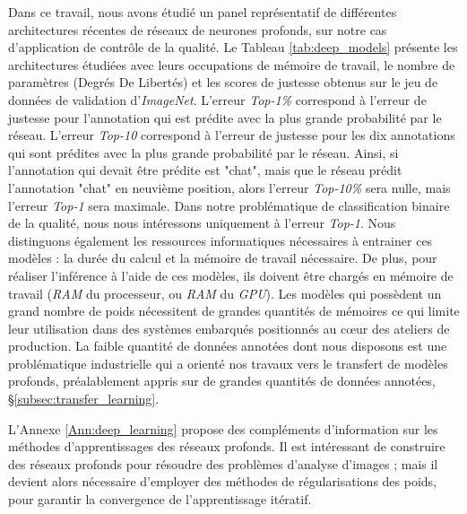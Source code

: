Dans ce travail, nous avons étudié un panel représentatif de différentes architectures récentes de réseaux de neurones profonds, sur notre cas d'application de contrôle de la qualité.
Le Tableau \ref{tab:deep_models} présente les architectures étudiées avec leurs occupations de mémoire de travail, le nombre de paramètres (Degrés De Libertés) et les scores de justesse obtenus sur le jeu de données de validation d'\textit{ImageNet}.
L'erreur \textit{Top-1\%} correspond à l'erreur de justesse pour l'annotation qui est prédite avec la plus grande probabilité par le réseau.
L'erreur \textit{Top-10} correspond à l'erreur de justesse pour les dix annotations qui sont prédites avec la plus grande probabilité par le réseau.
Ainsi, si l'annotation qui devait être prédite est "chat", mais que le réseau prédit l'annotation "chat" en neuvième position, alors l'erreur \textit{Top-10\%} sera nulle, mais l'erreur \textit{Top-1} sera maximale.
Dans notre problématique de classification binaire de la qualité, nous nous intéressons uniquement à l'erreur \textit{Top-1}.
Nous distinguons également les ressources informatiques nécessaires à entrainer ces modèles : la durée du calcul et la mémoire de travail nécessaire.
De plus, pour réaliser l'inférence à l'aide de ces modèles, ils doivent être chargés en mémoire de travail (\textit{RAM} du processeur, ou \textit{RAM} du \textit{GPU}).
Les modèles qui possèdent un grand nombre de poids nécessitent de grandes quantités de mémoires ce qui limite leur utilisation dans des systèmes embarqués positionnés au cœur des ateliers de production.
La faible quantité de données annotées dont nous disposons est une problématique industrielle qui a orienté nos travaux vers le transfert de modèles profonds, préalablement appris sur de grandes quantités de données annotées, §\ref{subsec:transfer_learning}.

L'Annexe \ref{Ann:deep_learning} propose des compléments d'information sur les méthodes d'apprentissages des réseaux profonds.
Il est intéressant de construire des réseaux profonds pour résoudre des problèmes d'analyse d'images ; mais il devient alors nécessaire d'employer des méthodes de régularisations des poids, pour garantir la convergence de l'apprentissage itératif.


